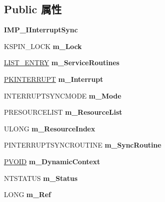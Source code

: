\subsection*{Public 属性}
\begin{DoxyCompactItemize}
\item 
\mbox{\label{class_c_interrupt_sync_ae0ab46740290d1d85da754b6f9dff4de}} 
{\bfseries I\+M\+P\+\_\+\+I\+Interrupt\+Sync}
\item 
\mbox{\label{class_c_interrupt_sync_afa9a7fd55ecb8d7fd05644fc7b5af7b0}} 
K\+S\+P\+I\+N\+\_\+\+L\+O\+CK {\bfseries m\+\_\+\+Lock}
\item 
\mbox{\label{class_c_interrupt_sync_a53a0109fba1d396dabc1a51b1b74155c}} 
\hyperlink{struct___l_i_s_t___e_n_t_r_y}{L\+I\+S\+T\+\_\+\+E\+N\+T\+RY} {\bfseries m\+\_\+\+Service\+Routines}
\item 
\mbox{\label{class_c_interrupt_sync_ab191172a51075c8a34cc36cdb25fb0c8}} 
\hyperlink{struct___k_i_n_t_e_r_r_u_p_t}{P\+K\+I\+N\+T\+E\+R\+R\+U\+PT} {\bfseries m\+\_\+\+Interrupt}
\item 
\mbox{\label{class_c_interrupt_sync_a661a1595f01820747fef47d9047782b0}} 
I\+N\+T\+E\+R\+R\+U\+P\+T\+S\+Y\+N\+C\+M\+O\+DE {\bfseries m\+\_\+\+Mode}
\item 
\mbox{\label{class_c_interrupt_sync_a1081df93bc6a7585f227706606875153}} 
P\+R\+E\+S\+O\+U\+R\+C\+E\+L\+I\+ST {\bfseries m\+\_\+\+Resource\+List}
\item 
\mbox{\label{class_c_interrupt_sync_aeb47a1739c33fec8cf1750b38e00fff2}} 
U\+L\+O\+NG {\bfseries m\+\_\+\+Resource\+Index}
\item 
\mbox{\label{class_c_interrupt_sync_adc89a6f537d0af8e64d66118de65ec66}} 
P\+I\+N\+T\+E\+R\+R\+U\+P\+T\+S\+Y\+N\+C\+R\+O\+U\+T\+I\+NE {\bfseries m\+\_\+\+Sync\+Routine}
\item 
\mbox{\label{class_c_interrupt_sync_a43d6bd9fa937825dd9120fb455a9b030}} 
\hyperlink{interfacevoid}{P\+V\+O\+ID} {\bfseries m\+\_\+\+Dynamic\+Context}
\item 
\mbox{\label{class_c_interrupt_sync_a709ba73c3b61ba9f41bedc3cf7131537}} 
N\+T\+S\+T\+A\+T\+US {\bfseries m\+\_\+\+Status}
\item 
\mbox{\label{class_c_interrupt_sync_a273b20039a4e12d9b004f8442a59577a}} 
L\+O\+NG {\bfseries m\+\_\+\+Ref}
\end{DoxyCompactItemize}
